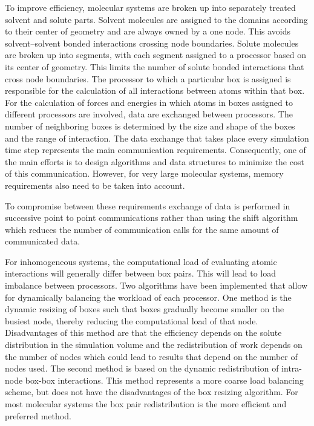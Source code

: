 To improve efficiency, molecular systems are broken up into separately
treated solvent and solute parts. Solvent molecules are assigned to
the domains according to their center of geometry and are always owned
by a one node. This avoids solvent--solvent bonded interactions
crossing node boundaries.  Solute molecules are broken up into
segments, with each segment assigned to a processor based on its
center of geometry.  This limits the number of solute bonded
interactions that cross node boundaries.  The processor to which a
particular box is assigned is responsible for the calculation of all
interactions between atoms within that box.  For the calculation of
forces and energies in which atoms in boxes assigned to different
processors are involved, data are exchanged between processors. The
number of neighboring boxes is determined by the size and shape of the
boxes and the range of interaction. The data exchange that takes place
every simulation time step represents the main communication
requirements.  Consequently, one of the main efforts is to design
algorithms and data structures to minimize the cost of this
communication. However, for very large molecular systems, memory
requirements also need to be taken into account.

To compromise between these requirements exchange of data is performed
in successive point to point communications rather than using the
shift algorithm which reduces the number of communication calls
for the same amount of communicated data.

For inhomogeneous systems, the computational load of evaluating 
atomic interactions will generally differ between box pairs. 
This will lead to load imbalance between processors.
Two algorithms have been implemented that allow for dynamically 
balancing the workload of each processor.
One method is the dynamic resizing of boxes such that boxes gradually
become smaller on the busiest node, thereby reducing the computational
load of that node. Disadvantages of this method are that the 
efficiency depends on the solute distribution in the simulation volume
and the redistribution of work depends on the number of nodes which
could lead to results that depend on the number of nodes used.
The second method is based on the dynamic redistribution of intra-node
box-box interactions. This method represents a more coarse load
balancing scheme, but does not have the disadvantages of the box
resizing algorithm. For most molecular systems the box pair
redistribution is the more efficient and preferred  method.

